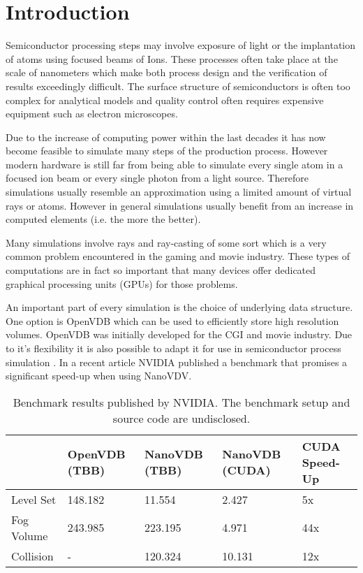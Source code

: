 \section{Introduction}

Semiconductor processing steps may involve exposure of light or the implantation of atoms using focused beams of Ions.
These processes often take place at the scale of nanometers which make both process design and the verification of results exceedingly difficult.
The surface structure of semiconductors is often too complex for analytical models and quality control often requires expensive equipment such as electron microscopes.

Due to the increase of computing power within the last decades it has now become feasible to simulate many steps of the production process.
However modern hardware is still far from being able to simulate every single atom in a focused ion beam or every single photon from a light source.
Therefore simulations usually resemble an approximation using a limited amount of virtual rays or atoms. 
However in general simulations usually benefit from an increase in computed elements (i.e. the more the better).

Many simulations involve rays and ray-casting of some sort which is a very common problem encountered in the gaming and movie industry.
These types of computations are in fact so important that many devices offer dedicated graphical processing units (GPUs) for those problems.

An important part of every simulation is the choice of underlying data structure. 
One option is OpenVDB which can be used to efficiently store high resolution volumes. \cite{openvdb}
OpenVDB was initially developed for the CGI and movie industry. Due to it's flexibility it is also possible to adapt it for use in semiconductor process simulation \cite{manstetten2018efficient}.
In a recent article  NVIDIA published a benchmark that promises a significant speed-up when using NanoVDV.

\begin{table}[H]
\caption{Benchmark results published by NVIDIA. The benchmark setup and source code are undisclosed. \cite{nanovdb_nvidia}}
\centering
\begin{tabular}{@{}lllll@{}}
	\toprule
			& OpenVDB (TBB) & NanoVDB (TBB) & NanoVDB (CUDA) & CUDA Speed-Up \\	\hline
Level Set  & 148.182       & 11.554        & 2.427          & 5x            \\
Fog Volume & 243.985       & 223.195       & 4.971          & 44x           \\
Collision  & -             & 120.324       & 10.131         & 12x          \\ \bottomrule
\end{tabular}
\label{tab:nvidia_benchmark}
\end{table}


